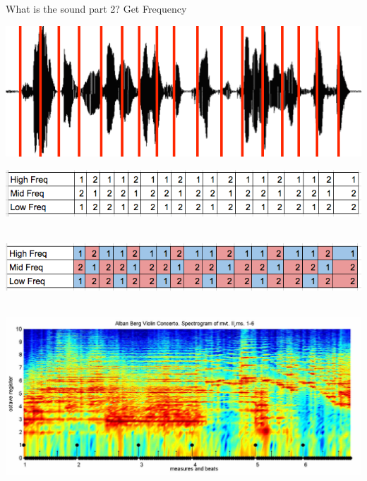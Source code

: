 \documentclass{beamer}
\begin{document}
\begin{frame}{What is the sound part 2? Get Frequency} 
	\begin{center}
		   \includegraphics[scale=0.5]{img/sound_sl}
		
		   \includegraphics[scale=0.4]{img/hist}~~~~~~~~
		
		   \includegraphics[scale=0.4]{img/histc}~~~~~~~~~
		
		    \includegraphics[scale=0.3]{img/spect}~~~~~~~~~
	\end{center}
	
\end{frame}
\end{document}
